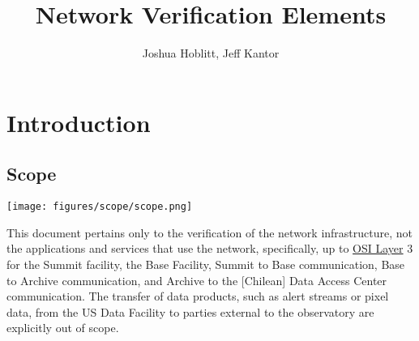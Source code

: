 \documentclass[DM,lsstdraft,STS,toc]{lsstdoc}
\begin{document}
\providecommand{\tightlist}{%
  \setlength{\itemsep}{0pt}\setlength{\parskip}{0pt}}

\def\product{LSST Data Management}


\title[Network Verification Elements]{Network Verification Elements}

\author{Joshua Hoblitt, Jeff Kantor}
\setDocRef{\lsstDocType-\lsstDocNum}
\setDocDate{\today}



\setDocUpstreamVersion{\vcsRevision}

\maketitle


\section{Introduction}\label{sec:intro}


\subsection{Scope}\label{sec:scope}

\begin{center}
\texttt{[image: figures/scope/scope.png]}
\end{center}

This document pertains only to the verification of the network infrastructure, not the applications and services that use the network, specifically, up to \href{https://en.wikipedia.org/wiki/OSI_model}{OSI Layer} 3 for the Summit facility, the Base Facility, Summit to Base communication, Base to Archive communication, and Archive to the [Chilean] Data Access Center communication.
The transfer of data products, such as alert streams or pixel data, from the US Data Facility to parties external to the observatory are explicitly out of scope.
\end{document}
